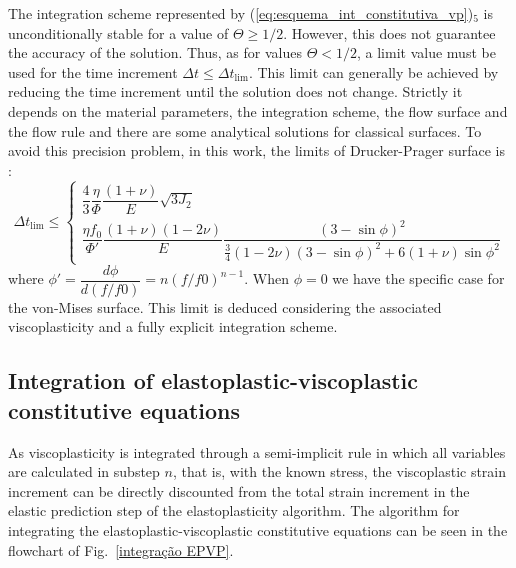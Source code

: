 \documentclass[Journal,letterpaper]{ascelike-new}
\begin{document}
The integration scheme represented by (\ref{eq:esquema_int_constitutiva_vp})$_5$ is unconditionally stable for a value of $\Theta \geq 1/2$. However, this does not guarantee the accuracy of the solution. Thus, as for values $\Theta < 1/2$, a limit value must be used for the time increment $\Delta t \leq \Delta t_{\text{lim}}$. This limit can generally be achieved by reducing the time increment until the solution does not change. Strictly it depends on the material parameters, the integration scheme, the flow surface and the flow rule and there are some analytical solutions for classical surfaces. To avoid this precision problem, in this work, the limits of Drucker-Prager surface is \cite{cormeau1975}:
\begin{equation}
	\label{eq:deltatmin_dp}
	\Delta t_{\text{lim}} \leq \left\{ 
	\begin{array}{lcl} 
		\dfrac{4}{3}\dfrac{\eta}{\Phi}\dfrac{(1+\nu)}{E} {\sqrt{3J_2}} \\
		\dfrac{\eta f_0}{\Phi'}\dfrac{(1+\nu)(1-2\nu)}{E}\dfrac{(3-\sin{\phi})^2}{\frac{3}{4}(1-2\nu)(3-\sin{\phi})^2 + 6(1+\nu)\sin{\phi}^2}
	\end{array} \right.
\end{equation}
where $\phi'= \dfrac{d \phi}{d(f/f0)} = n(f/f0)^{n-1}$. When $\phi = 0$ we have the specific case for the von-Mises surface. This limit is deduced considering the associated viscoplasticity and a fully explicit integration scheme. 


\subsection{Integration of elastoplastic-viscoplastic constitutive equations}

As viscoplasticity is integrated through a semi-implicit rule in which all variables are calculated in substep $n$, that is, with the known stress, the viscoplastic strain increment can be directly discounted from the total strain increment in the elastic prediction step of the elastoplasticity algorithm. The algorithm for integrating the elastoplastic-viscoplastic constitutive equations can be seen in the flowchart of Fig.~\ref{integração EPVP}.
\end{document}
